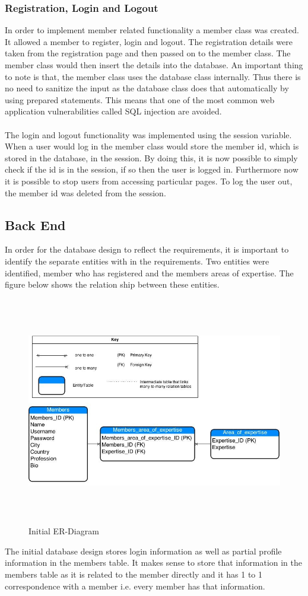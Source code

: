 \documentclass[a4paper,oneside,11pt]{report}
\begin{document}
\subsubsection{Registration, Login and Logout}
In order to implement member related functionality a member class was created. It allowed a member to register, login and logout. The registration details were taken from the registration page and then passed on to the member class. The member class would then insert the details into the database. An important thing to note is that, the member class uses the database class internally. Thus there is no need to sanitize the input as the database class does that automatically by using prepared statements. This means that one of the most common web application vulnerabilities called SQL injection are avoided.
\\
\\
The login and logout functionality was implemented using the session variable. When a user would log in the member class would store the member id, which is stored in the database, in the session. By doing this, it is now possible to simply check if the id is in the session, if so then the user is logged in. Furthermore now it is possible to stop users from accessing particular pages. To log the user out, the member id was deleted from the session.
\subsection{Back End}
In order for the database design to reflect the requirements, it is important to identify the separate entities with in the requirements. Two entities were identified, member who has registered and the members areas of expertise. The figure below shows the relation ship between these entities.

\begin{figure}[!ht]
\centering
\includegraphics[width=\textwidth,height=10cm]{Iteration-1-ER-Diagram.jpg}
\caption{Initial ER-Diagram}
\end{figure}
\pagebreak
The initial database design stores login information as well as partial profile information in the members table. It makes sense to store that information in the members table as it is related to the member directly and it has 1 to 1 correspondence with a member i.e. every member has that information.
\end{document}
